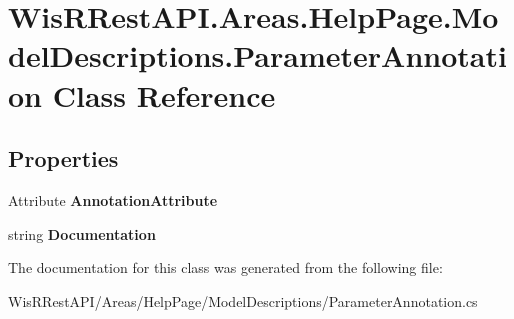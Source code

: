 \hypertarget{class_wis_r_rest_a_p_i_1_1_areas_1_1_help_page_1_1_model_descriptions_1_1_parameter_annotation}{}\section{Wis\+R\+Rest\+A\+P\+I.\+Areas.\+Help\+Page.\+Model\+Descriptions.\+Parameter\+Annotation Class Reference}
\label{class_wis_r_rest_a_p_i_1_1_areas_1_1_help_page_1_1_model_descriptions_1_1_parameter_annotation}
\subsection*{Properties}
\begin{DoxyCompactItemize}
\item 
\hypertarget{class_wis_r_rest_a_p_i_1_1_areas_1_1_help_page_1_1_model_descriptions_1_1_parameter_annotation_ad9765c9b160d7ce790464b7129ff21e8}{}Attribute {\bfseries Annotation\+Attribute}\label{class_wis_r_rest_a_p_i_1_1_areas_1_1_help_page_1_1_model_descriptions_1_1_parameter_annotation_ad9765c9b160d7ce790464b7129ff21e8}

\item 
\hypertarget{class_wis_r_rest_a_p_i_1_1_areas_1_1_help_page_1_1_model_descriptions_1_1_parameter_annotation_ace8c2c79542db4d5ecab26dacfc2d17e}{}string {\bfseries Documentation}\label{class_wis_r_rest_a_p_i_1_1_areas_1_1_help_page_1_1_model_descriptions_1_1_parameter_annotation_ace8c2c79542db4d5ecab26dacfc2d17e}

\end{DoxyCompactItemize}


The documentation for this class was generated from the following file\+:\begin{DoxyCompactItemize}
\item 
Wis\+R\+Rest\+A\+P\+I/\+Areas/\+Help\+Page/\+Model\+Descriptions/Parameter\+Annotation.\+cs\end{DoxyCompactItemize}
